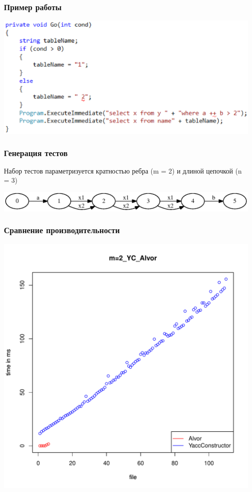 \documentclass{beamer}
\begin{document}
\begin{frame}
	\transwipe[direction=90]
	\frametitle{Пример работы}
    \begin{center}
		\includegraphics[width=0.89\linewidth]{WithReSharper}
    \end{center}
\end{frame}

\begin{frame}
	\transwipe[direction=90]
	\frametitle{Генерация тестов}
	Набор тестов параметризуется кратностью ребра (m = 2) и длиной цепочкой (n = 3)
	\begin{center}
	\centering \includegraphics[width=0.89\linewidth]{m2_n3}
	 \end{center}
\end{frame}

\begin{frame}
	\transwipe[direction=90]
	\frametitle{Сравнение производительности}
	\begin{center}
	\centering \includegraphics[width=0.65\linewidth]{m=2_YC_Alvor}
	 \end{center}
\end{frame}
\end{document}
